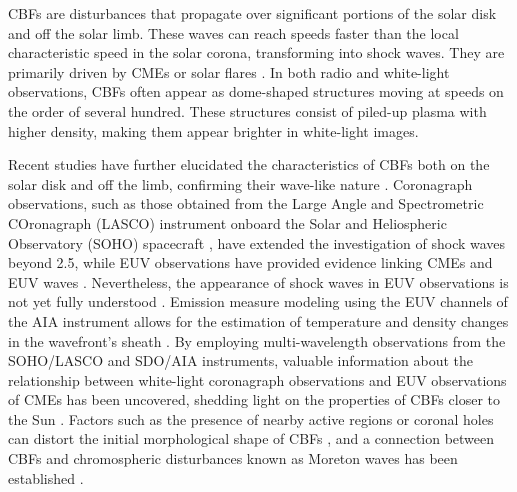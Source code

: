 CBFs are disturbances that propagate over significant portions of the solar disk and off the solar limb. These waves can reach speeds faster than the local characteristic speed in the solar corona, transforming into shock waves. They are primarily driven by CMEs or solar flares \citep{thompson_1998, veronig_2010, vrsnak_2008, magdaleni_2010, nindos_2011}. In both radio and white-light observations, CBFs often appear as dome-shaped structures moving at speeds on the order of several hundred\kms \citep{pick_2006, nindos_2008, thompson_2009}. These structures consist of piled-up plasma with higher density, making them appear brighter in white-light images.

Recent studies have further elucidated the characteristics of CBFs both on the solar disk and off the limb, confirming their wave-like nature \citep{nitta_2013, long_2011, olmedo_2012}. Coronagraph observations, such as those obtained from the Large Angle and Spectrometric COronagraph (LASCO) instrument onboard the Solar and Heliospheric Observatory (SOHO) spacecraft \citep{domingo_1995}, have extended the investigation of shock waves beyond 2.5\rsun \citep{vourlidas_2003}, while EUV observations have provided evidence linking CMEs and EUV waves \citep{patsourakos_2009}. Nevertheless, the appearance of shock waves in EUV observations is not yet fully understood \citep{kozarev_2011}. Emission measure modeling using the EUV channels of the AIA instrument allows for the estimation of temperature and density changes in the wavefront's sheath \citep{kozarev_2011}. By employing multi-wavelength observations from the SOHO/LASCO and SDO/AIA instruments, valuable information about the relationship between white-light coronagraph observations and EUV observations of CMEs has been uncovered, shedding light on the properties of CBFs closer to the Sun \citep{warmuth_2015}. Factors such as the presence of nearby active regions or coronal holes can distort the initial morphological shape of CBFs \citep{ofman_2002, mann_2003, piantschitsch_2018}, and a connection between CBFs and chromospheric disturbances known as Moreton waves has been established \citep{thompson_1999b}.

